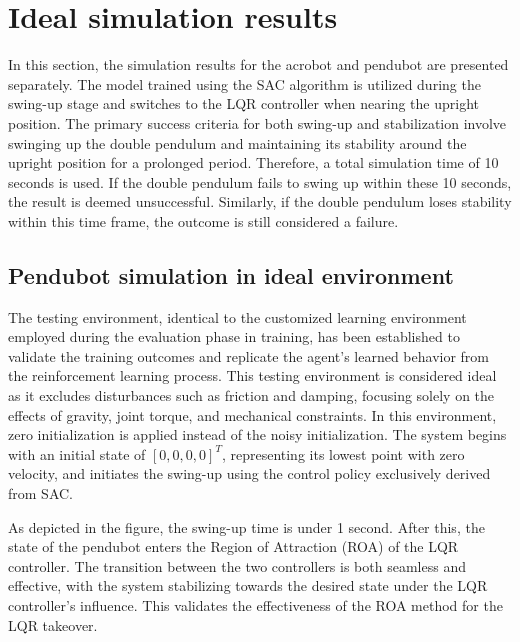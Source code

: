 
\section{Ideal simulation results}
In this section, the simulation results for the acrobot and pendubot are presented separately. The model trained using the SAC algorithm is utilized during the swing-up stage and switches to the LQR controller when nearing the upright position. The primary success criteria for both swing-up and stabilization involve swinging up the double pendulum and maintaining its stability around the upright position for a prolonged period. Therefore, a total simulation time of 10 seconds is used. If the double pendulum fails to swing up within these 10 seconds, the result is deemed unsuccessful. Similarly, if the double pendulum loses stability within this time frame, the outcome is still considered a failure.

\subsection{Pendubot simulation in ideal environment}
The testing environment, identical to the customized learning environment employed during the evaluation phase in training, has been established to validate the training outcomes and replicate the agent's learned behavior from the reinforcement learning process. This testing environment is considered ideal as it excludes disturbances such as friction and damping, focusing solely on the effects of gravity, joint torque, and mechanical constraints. In this environment, zero initialization is applied instead of the noisy initialization. The system begins with an initial state of \([0,0,0,0]^T\), representing its lowest point with zero velocity, and initiates the swing-up using the control policy exclusively derived from SAC.

As depicted in the figure, the swing-up time is under 1 second. After this, the state of the pendubot enters the Region of Attraction (ROA) of the LQR controller. The transition between the two controllers is both seamless and effective, with the system stabilizing towards the desired state under the LQR controller's influence. This validates the effectiveness of the ROA method for the LQR takeover.

